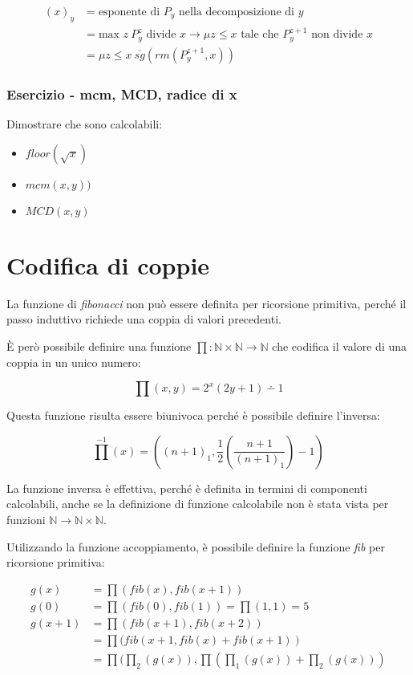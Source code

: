 \begin{align*}
	(x)_y 	&= \text{esponente di  } P_y \text{ nella decomposizione di } y \\
			   &= \text{max } z \: P_{y}^z \text{ divide } x \rightarrow \mu z \leq x \text{ tale che } P_{y}^{z+1} \text{ non divide } x \\
			   &= \mu z \leq x \: \overline{sg}(rm(P_{y}^{z+1},x))
\end{align*}

\subsubsection{Esercizio - mcm, MCD, radice di x}

Dimostrare che sono calcolabili:

\begin{itemize}
	\item $ floor(\sqrt{x}) $
	\item $mcm(x,y))$
	\item $MCD(x,y)$
\end{itemize}


\section{Codifica di coppie}

La funzione di \textit{fibonacci} non può essere definita per ricorsione primitiva, perché il passo induttivo richiede una coppia di valori precedenti.

\`{E} però possibile definire una funzione $\prod : \mathbb{N} \times \mathbb{N} \rightarrow \mathbb{N}$ che codifica il valore di una coppia in un unico numero:

$$
\prod (x,y) = 2^x(2y+1) \dotminus 1
$$

Questa funzione risulta essere biunivoca perché è possibile definire l'inversa:

$$
\prod^{-1}(x) = ((n+1)_1, \frac{1}{2}(\frac{n+1}{(n+1)_1})-1)
$$

La funzione inversa è effettiva, perché è definita in termini di componenti calcolabili, anche se la definizione di funzione calcolabile non è stata vista per funzioni $\mathbb{N} \rightarrow \mathbb{N} \times \mathbb{N}$.

Utilizzando la funzione accoppiamento, è possibile definire la funzione \textit{fib} per ricorsione primitiva:

\begin{align*}
	g(x) &= \prod(fib(x), fib(x+1)) \\
	g(0) &= \prod(fib(0), fib(1)) = \prod(1,1) = 5 \\
	g(x+1) &= \prod(fib(x+1), fib(x+2)) \\
				 &= \prod(fib(x+1, fib(x)+fib(x+1)) \\
				 &= \prod(\prod_2(g(x)),\prod(\prod_1(g(x))+\prod_2(g(x)))\\		 
\end{align*}

